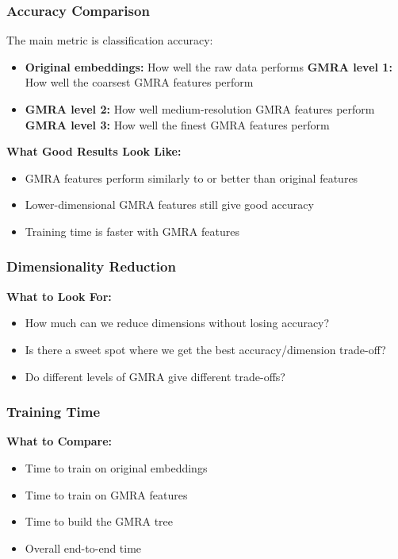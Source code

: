 \documentclass[12pt]{article}
\begin{document}
\subsubsection{Accuracy Comparison}

The main metric is classification accuracy:
\begin{itemize}
    \item \textbf{Original embeddings:} How well the raw data performs
    \textbf{GMRA level 1:} How well the coarsest GMRA features perform
    \item \textbf{GMRA level 2:} How well medium-resolution GMRA features perform
    \textbf{GMRA level 3:} How well the finest GMRA features perform
\end{itemize}

\textbf{What Good Results Look Like:}
\begin{itemize}
    \item GMRA features perform similarly to or better than original features
    \item Lower-dimensional GMRA features still give good accuracy
    \item Training time is faster with GMRA features
\end{itemize}

\subsubsection{Dimensionality Reduction}

\textbf{What to Look For:}
\begin{itemize}
    \item How much can we reduce dimensions without losing accuracy?
    \item Is there a sweet spot where we get the best accuracy/dimension trade-off?
    \item Do different levels of GMRA give different trade-offs?
\end{itemize}

\subsubsection{Training Time}

\textbf{What to Compare:}
\begin{itemize}
    \item Time to train on original embeddings
    \item Time to train on GMRA features
    \item Time to build the GMRA tree
    \item Overall end-to-end time
\end{itemize}
\end{document}

